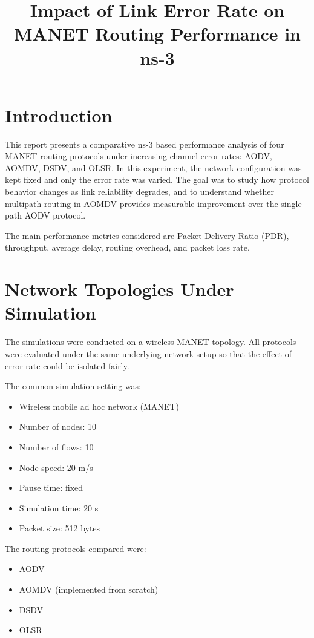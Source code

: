 \documentclass[11pt]{article}
\title{\textbf{Impact of Link Error Rate on MANET Routing Performance in ns-3}}
\author{}
\date{}
\begin{document}
\maketitle

\section{Introduction}

This report presents a comparative ns-3 based performance analysis of four MANET routing protocols under increasing channel error rates: AODV, AOMDV, DSDV, and OLSR. In this experiment, the network configuration was kept fixed and only the error rate was varied. The goal was to study how protocol behavior changes as link reliability degrades, and to understand whether multipath routing in AOMDV provides measurable improvement over the single-path AODV protocol.

The main performance metrics considered are Packet Delivery Ratio (PDR), throughput, average delay, routing overhead, and packet loss rate.

\section{Network Topologies Under Simulation}

The simulations were conducted on a wireless MANET topology. All protocols were evaluated under the same underlying network setup so that the effect of error rate could be isolated fairly.

The common simulation setting was:

\begin{itemize}
    \item Wireless mobile ad hoc network (MANET)
    \item Number of nodes: 10
    \item Number of flows: 10
    \item Node speed: 20 m/s
    \item Pause time: fixed
    \item Simulation time: 20 s
    \item Packet size: 512 bytes
\end{itemize}

The routing protocols compared were:

\begin{itemize}
    \item AODV
    \item AOMDV (implemented from scratch)
    \item DSDV
    \item OLSR
\end{itemize}
\end{document}

